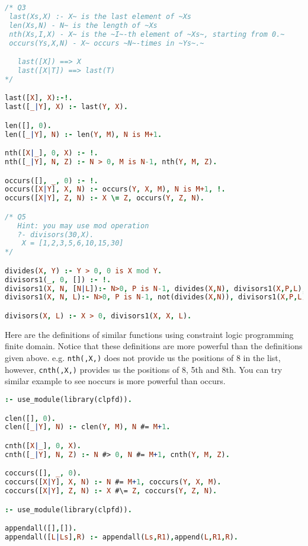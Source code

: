 \documentclass[fontsize=10pt]{slnotes}
\begin{document}
\begin{lstlisting}[escapechar=\~,escapebegin=\rmfamily,language=Prolog]
/* Q3
 last(Xs,X) :- X~ is the last element of ~Xs
 len(Xs,N) - N~ is the length of ~Xs
 nth(Xs,I,X) - X~ is the ~I~-th element of ~Xs~, starting from 0.~
 occurs(Ys,X,N) - X~ occurs ~N~-times in ~Ys~.~

   last([X]) ==> X
   last([X|T]) ==> last(T)
*/

last([X], X):-!.
last([_|Y], X) :- last(Y, X).

len([], 0).
len([_|Y], N) :- len(Y, M), N is M+1.

nth([X|_], 0, X) :- !.
nth([_|Y], N, Z) :- N > 0, M is N-1, nth(Y, M, Z).

occurs([], _, 0) :- !.
occurs([X|Y], X, N) :- occurs(Y, X, M), N is M+1, !.
occurs([X|Y], Z, N) :- X \= Z, occurs(Y, Z, N).

/* Q5
   Hint: you may use mod operation
   ?- divisors(30,X).
	X = [1,2,3,5,6,10,15,30]
*/

divides(X, Y) :- Y > 0, 0 is X mod Y.
divisors1(_, 0, []) :- !.
divisors1(X, N, [N|L]):- N>0, P is N-1, divides(X,N), divisors1(X,P,L), !.
divisors1(X, N, L):- N>0, P is N-1, not(divides(X,N)), divisors1(X,P,L).

divisors(X, L) :- X > 0, divisors1(X, X, L).
\end{lstlisting}
Here are the definitions of similar functions using constraint logic programming finite domain. Notice that these definitions are more powerful than the definitions given above. e.g. \texttt{nth\-(\-[\-1\-,\-4\-,\-10\-,\-5\-,\-4\-,\-8\-,\-10\-,\-7\-,\-8\-,\-10\-]\-,\-X\-,\-)} does not provide us the positions of 8 in the list, however, \texttt{cnth\-(\-[\-1\-,\-4\-,\-10\-,\-5\-,\-4\-,\-8\-,\-10\-,\-7\-,\-8\-,\-10\-]\-,\-X\-,\-)} provides us the positions of 8, 5th and 8th. You can try similar example to see noccurs is more powerful than occurs.
\begin{lstlisting}[escapechar=\~,escapebegin=\rmfamily,language=Prolog]
:- use_module(library(clpfd)).

clen([], 0).
clen([_|Y], N) :- clen(Y, M), N #= M+1.

cnth([X|_], 0, X).
cnth([_|Y], N, Z) :- N #> 0, N #= M+1, cnth(Y, M, Z).

coccurs([], _, 0).
coccurs([X|Y], X, N) :- N #= M+1, coccurs(Y, X, M).
coccurs([X|Y], Z, N) :- X #\= Z, coccurs(Y, Z, N).

:- use_module(library(clpfd)).

appendall([],[]).
appendall([L|Ls],R) :- appendall(Ls,R1),append(L,R1,R).
\end{lstlisting}
\end{document}
